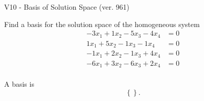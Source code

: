 \begin{exercise}
  \begin{exerciseTitle}V10 - Basis of Solution Space (ver. 961)\end{exerciseTitle}
  \begin{exerciseStatement}
    Find a basis for the solution space of the homogeneous system 
\begin{align*}
 -3 x_ 1 + 1 x_ 2 -5 x_ 3 -4 x_ 4 &= 0  \\ 
  1 x_ 1 + 5 x_ 2 -1 x_ 3 -1 x_ 4 &= 0  \\ 
  -1 x_ 1 + 2 x_ 2 -1 x_ 3 + 4 x_ 4 &= 0  \\ 
  -6 x_ 1 + 3 x_ 2 -6 x_ 3 + 2 x_ 4 &= 0  \\ 
 \end{align*}


 
  \end{exerciseStatement}

  \begin{exerciseAnswer}
   A basis is   
\[\left\{\right\}.\]

  


  \end{exerciseAnswer}
\end{exercise}